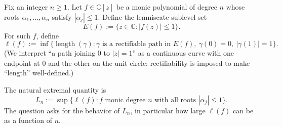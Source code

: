 Fix an integer \(n\ge 1\). Let \(f\in\mathbb{C}[z]\) be a monic polynomial of degree \(n\) whose roots \(\alpha_1,\dots,\alpha_n\) satisfy \(|\alpha_j|\le 1\).
Define the lemniscate sublevel set
\[
E(f):=\{z\in\mathbb{C}: |f(z)|\le 1\}.
\]
For such \(f\), define
\[
\ell(f):=\inf\{\operatorname{length}(\gamma): \gamma\text{ is a rectifiable path in }E(f),\ \gamma(0)=0,\ |\gamma(1)|=1\}.
\]
(We interpret ``a path joining \(0\) to \(|z|=1\)'' as a continuous curve with one endpoint at \(0\) and the other on the unit circle; rectifiability is imposed to make ``length'' well-defined.)

The natural extremal quantity is
\[
L_n:=\sup\{\ell(f): f\text{ monic degree }n\text{ with all roots }|\alpha_j|\le 1\}.
\]
The question asks for the behavior of \(L_n\), in particular how large \(\ell(f)\) can be as a function of \(n\).
